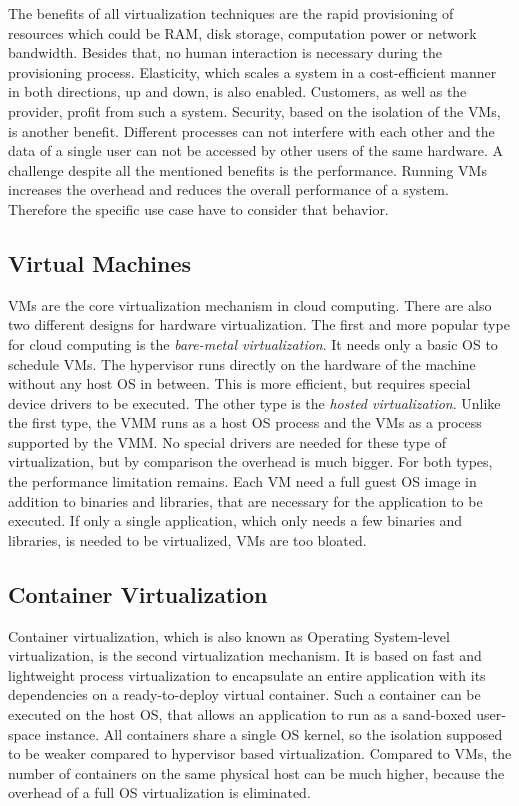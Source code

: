 The benefits of all virtualization techniques are the rapid provisioning of resources which could be \ac{RAM}, disk storage, computation power or network bandwidth.
Besides that, no human interaction is necessary during the provisioning process.
Elasticity, which scales a system in a cost-efficient manner in both directions, up and down, is also enabled.
Customers, as well as the provider, profit from such a system.
Security, based on the isolation of the \acp{VM}, is another benefit.
Different processes can not interfere with each other and the data of a single user can not be accessed by other users of the same hardware.
A challenge despite all the mentioned benefits is the performance.
Running \acp{VM} increases the overhead and reduces the overall performance of a system.
Therefore the specific use case have to consider that behavior.


\subsection{Virtual Machines}
\acp{VM} are the core virtualization mechanism in cloud computing.
There are also two different designs for hardware virtualization.
The first and more popular type for cloud computing is the \textit{bare-metal virtualization}.
It needs only a basic OS to schedule \acp{VM}.
The hypervisor runs directly on the hardware of the machine without any host \ac{OS} in between.
This is more efficient, but requires special device drivers to be executed.
The other type is the \textit{hosted virtualization}.
Unlike the first type, the \ac{VMM} runs as a host \ac{OS} process and the \acp{VM} as a process supported by the \ac{VMM}.
No special drivers are needed for these type of virtualization, but by comparison the overhead is much bigger.
For both types, the performance limitation remains.
Each \ac{VM} need a full guest \ac{OS} image in addition to binaries and libraries, that are necessary for the application to be executed.\autocite[cf.][p. 381]{Pahl:2015}
If only a single application, which only needs a few binaries and libraries, is needed to be virtualized, \acp{VM} are too bloated.


\subsection{Container Virtualization}
Container virtualization, which is also known as Operating System-level virtualization, is the second virtualization mechanism.
It is based on fast and lightweight process virtualization to encapsulate an entire application with its dependencies on a ready-to-deploy virtual container.\autocite[cf.][p. 72]{Tosatto:2015}
Such a container can be executed on the host \ac{OS}, that allows an application to run as a sand-boxed user-space instance.\autocite[cf.][p. 1]{Anderson:2016}
All containers share a single \ac{OS} kernel, so the isolation supposed to be weaker compared to hypervisor based virtualization.\autocite[cf.][p. 2]{Celesti:2016}
Compared to \acp{VM}, the number of containers on the same physical host can be much higher, because the overhead of a full \ac{OS} virtualization is eliminated.\autocite[cf.][p. 2]{Celesti:2016}


